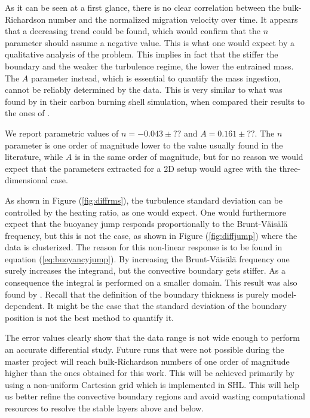 As it can be seen at a first glance, there is no clear correlation between the bulk-Richardson number and the normalized migration velocity over time. It appears that a decreasing trend could be found, which would confirm that the $n$ parameter should assume a negative value. This is what one would expect by a qualitative analysis of the problem. This implies in fact that the stiffer the boundary and the weaker the turbulence regime, the lower the entrained mass. The $A$ parameter instead, which is essential to quantify the mass ingestion, cannot be reliably determined by the data. This is very similar to what was found by \citet{cristini} in their carbon burning shell simulation, when compared their results to the ones of \citet{meakin}. 

We report parametric values of $n=-0.043 \pm ??$ and $A=0.161 \pm ??$. The $n$ parameter is one order of magnitude lower to the value usually found in the literature, while $A$ is in the same order of magnitude, but for no reason we would expect that the parameters extracted for a 2D setup would agree with the three-dimensional case.

As shown in Figure (\ref{fig:diffrms}), the turbulence standard deviation can be controlled by the heating ratio, as one would expect. One would furthermore expect that the buoyancy jump responds proportionally to the Brunt-Väisälä frequency, but this is not the case, as shown in Figure (\ref{fig:diffjump}) where the data is clusterized. The reason for this non-linear response is to be found in equation (\ref{eq:buoyancyjump}). By increasing the Brunt-Väisälä frequency one surely increases the integrand, but the convective boundary gets stiffer. As a consequence the integral is performed on a smaller domain. This result was also found by \citet{arnett2009}. Recall that the definition of the boundary thickness is purely model-dependent. It might be the case that the standard deviation of the boundary position is not the best method to quantify it.




The error values clearly show that the data range is not wide enough to perform an accurate differential study. Future runs that were not possible during the master project will reach bulk-Richardson numbers of one order of magnitude higher than the ones obtained for this work. This will be achieved primarily by using a non-uniform Cartesian grid which is implemented in SHL. This will help us better refine the convective boundary regions and avoid wasting computational resources to resolve the stable layers above and below.

